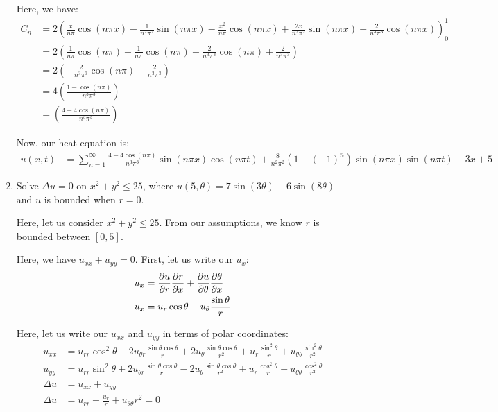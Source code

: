 \documentclass{article}
\begin{document}
\begin{enumerate}
  Here, we have:
  \begin{align}
    C_n & = 2 \left(
    \frac{x}{n \pi} \cos(n \pi x) - \frac{1}{n^2 \pi^2} \sin(n \pi x) -
    \frac{x^2}{n \pi} \cos(n \pi x) + \frac{2x}{n^2 \pi^2} \sin(n \pi x) + \frac{2}{n^3 \pi^3} \cos(n \pi x)
    \right)^1_0\\
    & = 2 \left( \frac{1}{n \pi} \cos(n \pi) - \frac{1}{n \pi} \cos(n \pi) - \frac{2}{n^3 \pi^3} \cos(n \pi) + \frac{2}{n^3 \pi^3} \right)\\
    & = 2 \left( - \frac{2}{n^3 \pi^3} \cos(n \pi) + \frac{2}{n^3 \pi^3} \right)\\
    & = 4 \left(\frac{1 - \cos(n \pi)}{n^3 \pi^3} \right)\\
    & = \left(\frac{4 - 4\cos(n \pi)}{n^3 \pi^3} \right)
  \end{align}

  Now, our heat equation is:
  \begin{align}
    u(x, t) & =
    \sum^\infty_{n = 1} \frac{4 - 4\cos(n \pi)}{n^3 \pi^3} \sin(n \pi x) \cos(n \pi t) + \frac{8}{n^2 \pi^2} (1 - (-1)^n) \sin(n \pi x) \sin(n \pi t) - 3x + 5
  \end{align}
\newpage
\setcounter{equation}{0}
  \item Solve $\Delta u = 0$ on $x^2 + y^2 \leq 25$, where $u(5, \theta) = 7 \sin(3 \theta) - 6 \sin(8 \theta)$ and $u$ is bounded when $r = 0$.

  Here, let us consider $x^2 + y^2 \leq 25$. From our assumptions, we know $r$ is bounded between $[0, 5]$.

  Here, we have $u_{xx} + u_{yy} = 0$. First, let us write our $u_x$:
  \begin{align}
    u_x & = \frac{\partial u}{\partial r} \frac{\partial r}{\partial x} + \frac{\partial u}{\partial \theta} \frac{\partial \theta}{\partial x}\\
    u_x & = u_r \cos \theta - u_\theta \frac{\sin \theta}{r}
  \end{align}

  Here, let us write our $u_{xx}$ and $u_{yy}$ in terms of polar coordinates:
  \begin{align}
    u_{xx} & = u_{rr} \cos^2 \theta
    - 2 u_{\theta r} \frac{\sin \theta \cos \theta}{r}
    + 2 u_\theta \frac{\sin \theta \cos \theta}{r^2}
    + u_r \frac{\sin^2 \theta}{r} + u_{\theta \theta} \frac{\sin^2 \theta}{r^2}\\
    u_{yy} &
    = u_{rr} \sin^2 \theta
    + 2u_{\theta r} \frac{\sin \theta \cos \theta}{r}
    - 2u_\theta \frac{\sin \theta \cos \theta}{r^2}
    + u_r \frac{\cos^2 \theta}{r}
    + u_{\theta \theta} \frac{\cos^2 \theta}{r^2}\\
    \Delta u & = u_{xx} + u_{yy}\\
    \Delta u & = u_{rr} + \frac{u_r}{r} + u_{\theta\theta}{r^2} = 0
  \end{align}


\end{enumerate}
\end{document}

